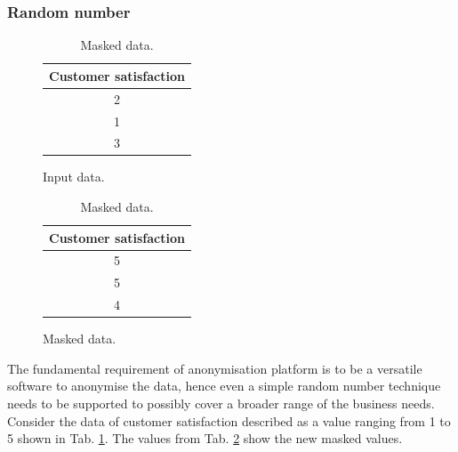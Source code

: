 \documentclass[a4paper,twoside,12pt]{book}
\begin{document}
\subsubsection{Random number}


\begin{table}
\centering
\caption{Random number.}
\begin{subfigure}{.4\textwidth}
	\centering
	\caption{Input data.}
	\label{id:tab:random_number_raw}
	\begin{tabular}{c}
	\toprule
	Customer satisfaction \\ \midrule
	2                     \\
	1                     \\
	3                     \\ \bottomrule
	\end{tabular}
\end{subfigure}
\begin{subfigure}{.4\textwidth}
\centering
\caption{Masked data.}
\label{id:tab:random_number_masked}
\begin{tabular}{c}
\toprule
Customer satisfaction \\ \midrule
5                     \\
5                     \\
4                     \\ \bottomrule
\end{tabular}
\end{subfigure}
\end{table}

The fundamental requirement of anonymisation platform is to be a versatile software to anonymise the data, hence even a simple random number technique needs to be supported to possibly cover a broader range of the business needs.
%
Consider the data of customer satisfaction described as a value ranging from 1 to 5 shown in Tab. \ref{id:tab:random_number_raw}.
%
%
The values from Tab. \ref{id:tab:random_number_masked} show the new masked values.
%
\end{document}
